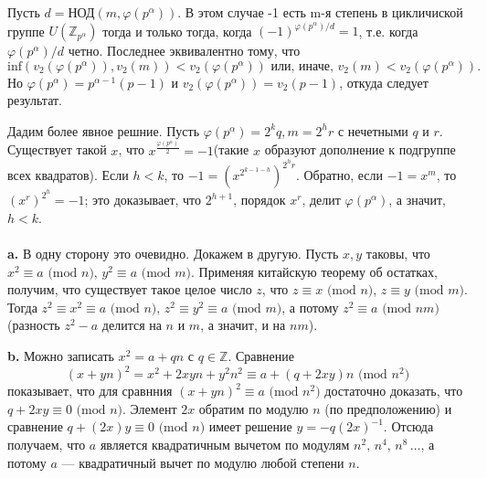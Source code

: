 \documentclass{mai_book}
\begin{document}
Пусть $d = \text{НОД} (m, \varphi(p^{\alpha}))$. В этом случае -1 есть m-я степень в цикличиской группе $U(\mathbb{Z}_{p^{\alpha}})$ тогда и только тогда, когда $(-1)^{\varphi(p^{\alpha})/d} = 1$, т.е. когда $\varphi(p^{\alpha})/d$ четно. Последнее эквивалентно тому, что
\begin{equation*}
	\text{inf}(v_{2}(\varphi(p^{\alpha})), v_{2}(m)) < v_{2}(\varphi(p^{\alpha})) \text{ или, иначе, } v_{2}(m) < v_{2}(\varphi(p^{\alpha})).
\end{equation*}
Но $\varphi(p^{\alpha}) = p^{\alpha - 1}(p -1)$ и $v_{2}(\varphi(p^{\alpha})) = v_{2}(p-1)$, откуда следует результат.\par
Дадим более явное решние. Пусть $\varphi(p^{\alpha}) = 2^{k}q, m = 2^{h}r$ с нечетными $q$ и $r$. Существует такой $x$, что $x^{\frac{\varphi(p^{\alpha})}{2}} = -1$(такие $x$ образуют дополнение к подгруппе всех квадратов). Если $h < k$, то $-1 = (x^{2^{k - 1 - h}})^{2^{h}r}$. Обратно, если $-1 = x^{m}$, то $(x^{r})^{2^{h}} = -1$; это доказывает, что $2^{h+1}$, порядок $x^{r}$, делит $\varphi(p^{\alpha})$, а значит, $h < k$. \\

 \\

\textbf{a. } В одну сторону это очевидно. Докажем в другую. Пусть $x, y$ таковы, что $x^{2} \equiv a \text{ (mod } n),\, y^{2} \equiv a \text{ (mod } m)$. Применяя китайскую теорему об остатках, получим,  что существует такое целое число $z$, что $z \equiv x \text{ (mod } n)$, $z \equiv y \text{ (mod } m)$. Тогда $z^{2} \equiv x^{2} \equiv a \text{ (mod } n), \, z^{2} \equiv y^{2} \equiv a \text{ (mod } m)$, а потому $z^{2} \equiv a \text{ (mod } nm)$ (разность $z^{2}-a$ делится на $n$ и $m$, а значит, и на $nm$). \smallskip

\textbf{b. } Можно записать $x^{2} = a + qn$ с $q \in \mathbb{Z}$. Сравнение
\begin{equation*}
	(x+yn)^{2} = x^{2} + 2xyn + y^{2}n^{2} \equiv a + (q + 2xy)n \text{ (mod } n^{2})
\end{equation*}
показывает, что для сравнния $(x+yn)^{2} \equiv a \text{ (mod } n^{2})$ достаточно доказать, что $q+2xy \equiv 0 \text{ (mod } n)$. Элемент $2x$ обратим по модулю $n$ (по предположению) и сравнение $q + (2x)y \equiv 0 \text{ (mod } n)$ имеет решение $y = -q(2x)^{-1}$. Отсюда получаем, что $a$ является квадратичным вычетом по модулям $n^{2}, \, n^{4}, \, n^{8} \, \ldots $, а потому $a$ --- квадратичный вычет по модулю любой степени $n$. \smallskip
\end{document}
